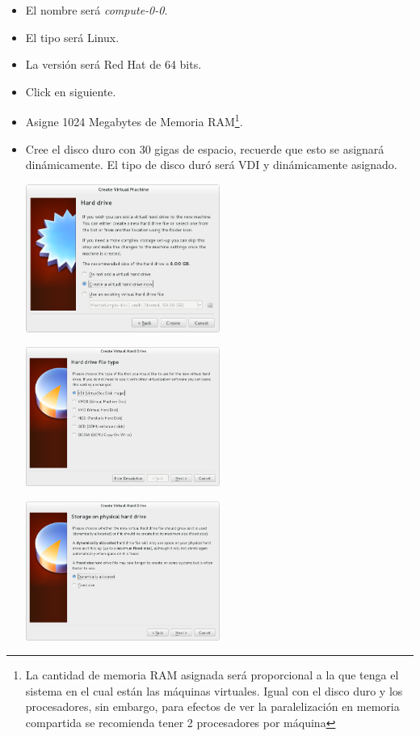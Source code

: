 \begin{enumerate}
\begin{itemize}
	\item El nombre será \textit{compute-0-0}.

	\item El tipo será Linux.

	\item La versión será Red Hat de 64 bits.

	

	\item Click en siguiente.

	\item Asigne 1024 Megabytes de Memoria RAM\footnote{La cantidad de memoria RAM asignada será proporcional a la que tenga el sistema en el cual están las máquinas virtuales. Igual con el disco duro y los procesadores, sin embargo, para efectos de ver la paralelización en memoria compartida se recomienda tener 2 procesadores por máquina}.

	\item Cree el disco duro con 30 gigas de espacio, recuerde que esto se asignará dinámicamente. El tipo de disco duró será VDI y dinámicamente asignado.



	\includegraphics[width=0.5\textwidth]{aux/nodohd}

	
	\includegraphics[width=0.5\textwidth]{aux/nododvi}


	\includegraphics[width=0.5\textwidth]{aux/hddinamico}



\end{itemize}
\end{enumerate}
